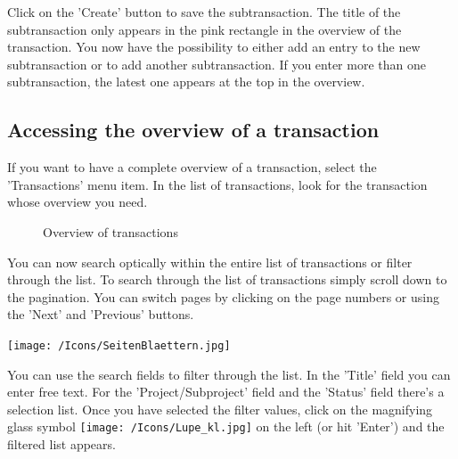 Click on the 'Create' button  to save the subtransaction. The title of the subtransaction only appears in the pink rectangle in the overview of the transaction. You now have the possibility to either add an entry to the new subtransaction or to add another subtransaction. If you enter more than one subtransaction, the latest one appears at the top in the overview.

\subsection{Accessing the overview of a transaction}

If you want to have a complete overview of a transaction, select the 'Transactions' menu item. In the list of transactions, look for the transaction whose overview you need.

\begin{figure}[H]
\caption{Overview of transactions}
\end{figure}

You can now search optically within the entire list of transactions or filter through the list. To search through the list of transactions simply scroll down to the pagination. You can switch pages by clicking on the page numbers or using the 'Next' and 'Previous' buttons.

\begin{center}
\texttt{[image: /Icons/SeitenBlaettern.jpg]}
\end{center}

You can use the search fields to filter through the list. In the 'Title' field  you can enter free text. For the 'Project/Subproject' field  and the 'Status' field  there's a selection list. Once you have selected the filter values, click on the magnifying glass symbol \texttt{[image: /Icons/Lupe\_kl.jpg]}  on the left (or hit 'Enter') and the filtered list appears.

